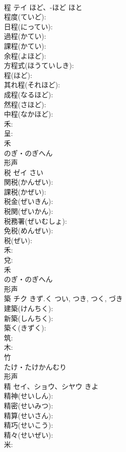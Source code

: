 \documentclass[8pt]{extreport}
\begin{document}
\begin{CJK}{UTF8}{min}
\\	程	テイ	ほど、-ほど	ほと	
\\	程度(ていど): 
\\	日程(にってい): 
\\	過程(かてい): 
\\	課程(かてい): 
\\	余程(よほど): 
\\	方程式(ほうていしき): 
\\	程(ほど): 
\\	其れ程(それほど): 
\\	成程(なるほど): 
\\	然程(さほど): 
\\	中程(なかほど): 
\\	禾: 
\\	呈: 
\\	禾	
\\	のぎ・のぎへん	
\\	形声 
\\	税	ゼイ		さい	
\\	関税(かんぜい): 
\\	課税(かぜい): 
\\	税金(ぜいきん): 
\\	税関(ぜいかん): 
\\	税務署(ぜいむしょ): 
\\	免税(めんぜい): 
\\	税(ぜい): 
\\	禾: 
\\	兌: 
\\	禾	
\\	のぎ・のぎへん	
\\	形声 
\\	築	チク	きず.く	つい, つき, つく, づき	
\\	建築(けんちく): 
\\	新築(しんちく): 
\\	築く(きずく): 
\\	筑: 
\\	木: 
\\	竹	
\\	たけ・たけかんむり	
\\	形声 
\\	精	セイ、ショウ、シヤウ		きよ	
\\	精神(せいしん): 
\\	精密(せいみつ): 
\\	精算(せいさん): 
\\	精巧(せいこう): 
\\	精々(せいぜい): 
\\	米: 

\end{CJK}
\end{document}
